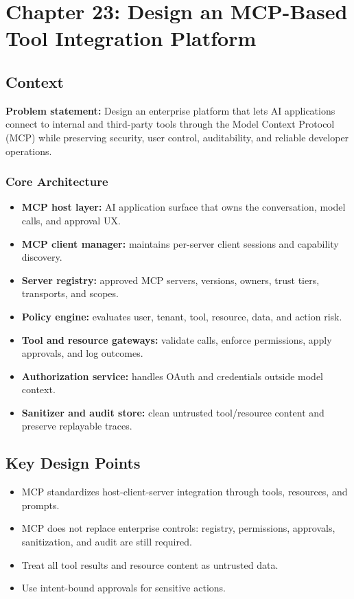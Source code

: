 \chapter{Chapter 23: Design an MCP-Based Tool Integration Platform}

\section*{Context}
\textbf{Problem statement:} Design an enterprise platform that lets AI applications connect to internal and third-party tools through the Model Context Protocol (MCP) while preserving security, user control, auditability, and reliable developer operations.

\subsection*{Core Architecture}
\begin{itemize}
  \item \textbf{MCP host layer:} AI application surface that owns the conversation, model calls, and approval UX.
  \item \textbf{MCP client manager:} maintains per-server client sessions and capability discovery.
  \item \textbf{Server registry:} approved MCP servers, versions, owners, trust tiers, transports, and scopes.
  \item \textbf{Policy engine:} evaluates user, tenant, tool, resource, data, and action risk.
  \item \textbf{Tool and resource gateways:} validate calls, enforce permissions, apply approvals, and log outcomes.
  \item \textbf{Authorization service:} handles OAuth and credentials outside model context.
  \item \textbf{Sanitizer and audit store:} clean untrusted tool/resource content and preserve replayable traces.
\end{itemize}

\section*{Key Design Points}
\begin{itemize}
  \item MCP standardizes host-client-server integration through tools, resources, and prompts.
  \item MCP does not replace enterprise controls: registry, permissions, approvals, sanitization, and audit are still required.
  \item Treat all tool results and resource content as untrusted data.
  \item Use intent-bound approvals for sensitive actions.
\end{itemize}

